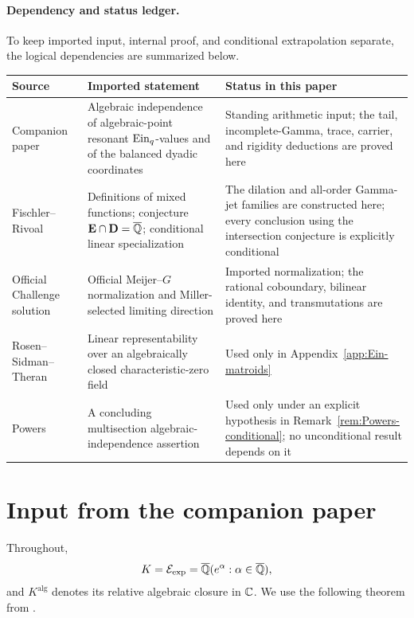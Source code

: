 \paragraph{Dependency and status ledger.}
To keep imported input, internal proof, and conditional extrapolation
separate, the logical dependencies are summarized below.
\begin{center}
\small
\begin{tabular}{@{}
 >{\raggedright\arraybackslash}p{}
 >{\raggedright\arraybackslash}p{}
 >{\raggedright\arraybackslash}p{}@{}}
\toprule
Source & Imported statement & Status in this paper\\
\midrule
Companion paper \cite[Thms.~1.4, 5.1 and Lem.~11.2]{KEIO2026I}
& Algebraic independence of algebraic-point resonant \(\operatorname{Ein}_q\)-values
and of the balanced dyadic coordinates
& Standing arithmetic input; the tail, incomplete-Gamma, trace, carrier,
and rigidity deductions are proved here\\
Fischler--Rivoal \cite{FischlerRivoalMixed2024}
& Definitions of mixed functions; conjecture
\(\mathbf E\cap\mathbf D=\overline{\mathbb Q}\); conditional linear specialization
& The dilation and all-order Gamma-jet families are constructed here;
every conclusion using the intersection conjecture is explicitly
conditional\\
Official Challenge solution \cite[\S5.2]{RamanujanOfficial2026}
& Official Meijer--\(G\) normalization and Miller-selected limiting direction
& Imported normalization; the rational coboundary, bilinear identity, and
transmutations are proved here\\
Rosen--Sidman--Theran \cite[Thm.~1.10]{RosenSidmanTheran2025}
& Linear representability over an algebraically closed characteristic-zero
field
& Used only in Appendix~\ref{app:Ein-matroids}\\
Powers \cite[\S5]{Powers2025}
& A concluding multisection algebraic-independence assertion
& Used only under an explicit hypothesis in
Remark~\ref{rem:Powers-conditional}; no unconditional result depends on it\\
\bottomrule
\end{tabular}
\end{center}

\section{Input from the companion paper}
\label{sec:input}

Throughout,
\[
 K=\mathcal E_{\mathrm{exp}}=\overline{\mathbb Q}(e^\alpha:\alpha\in\overline{\mathbb Q}),
\]
and \(K^{\mathrm{alg}}\) denotes its relative algebraic closure in \(\mathbb C\).
We use the following theorem from \cite[Thm.~5.1]{KEIO2026I}.

